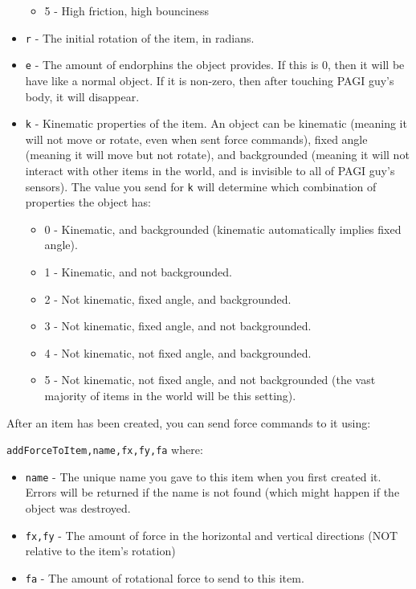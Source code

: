 \begin{itemize}
\begin{itemize}
	\item 5 - High friction, high bounciness
	\end{itemize}
\item \texttt{r} - The initial rotation of the item, in radians. 
\item \texttt{e} - The amount of endorphins the object provides. If this is 0, then it will be have like a normal object. If it is non-zero, then after touching PAGI guy's body, it will disappear.
\item \texttt{k} - Kinematic properties of the item. An object can be kinematic (meaning it will not move or rotate, even when sent force commands), fixed angle (meaning it will move but not rotate), and backgrounded (meaning it will not interact with other items in the world, and is invisible to all of PAGI guy's sensors). The value you send for \texttt{k} will determine which combination of properties the object has:
	\begin{itemize}
	\item 0 - Kinematic, and backgrounded (kinematic automatically implies fixed angle).
	\item 1 - Kinematic, and not backgrounded. 
	\item 2 - Not kinematic, fixed angle, and backgrounded.
	\item 3 - Not kinematic, fixed angle, and not backgrounded.
	\item 4 - Not kinematic, not fixed angle, and backgrounded.
	\item 5 - Not kinematic, not fixed angle, and not backgrounded (the vast majority of items in the world will be this setting).
	\end{itemize}
\end{itemize}

After an item has been created, you can send force commands to it using:

\texttt{addForceToItem,name,fx,fy,fa} where:

\begin{itemize}
\item \texttt{name} - The unique name you gave to this item when you first created it. Errors will be returned if the name is not found (which might happen if the object was destroyed.
\item \texttt{fx,fy} - The amount of force in the horizontal and vertical directions (NOT relative to the item's rotation)
\item \texttt{fa} - The amount of rotational force to send to this item.
\end{itemize}

